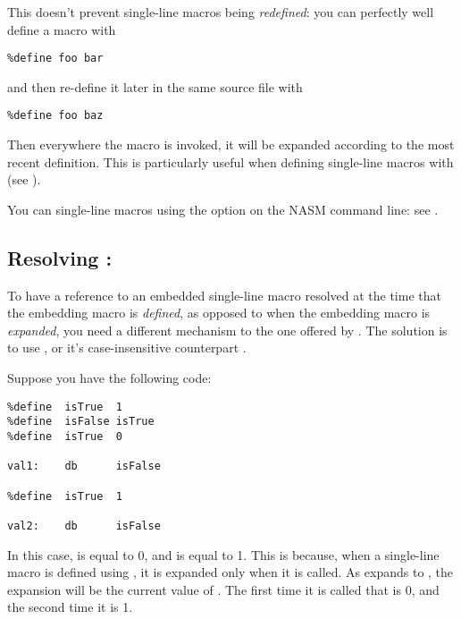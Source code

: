 This doesn't prevent single-line macros being \emph{redefined}:
you can perfectly well define a macro with

\begin{lstlisting}
%define foo bar
\end{lstlisting}

and then re-define it later in the same source file with

\begin{lstlisting}
%define foo baz
\end{lstlisting}

Then everywhere the macro  is invoked, it will be expanded
according to the most recent definition. This is particularly useful
when defining single-line macros with 
(see ).

You can  single-line macros using the 
option on the NASM command line: see .

\subsection{Resolving : }
\label{subsec:xdefine}

To have a reference to an embedded single-line macro resolved at the
time that the embedding macro is \emph{defined}, as opposed to when the
embedding macro is \emph{expanded}, you need a different mechanism to the
one offered by . The solution is to use , or
it's case-insensitive counterpart .

Suppose you have the following code:

\begin{lstlisting}
%define  isTrue  1
%define  isFalse isTrue
%define  isTrue  0

val1:    db      isFalse

%define  isTrue  1

val2:    db      isFalse
\end{lstlisting}

In this case,  is equal to 0, and  is equal to 1.
This is because, when a single-line macro is defined using ,
it is expanded only when it is called. As  expands to ,
the expansion will be the current value of . The first time it is called
that is 0, and the second time it is 1.

